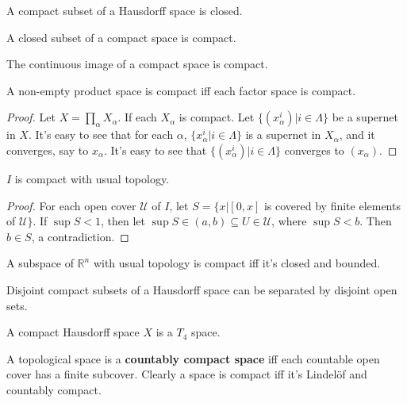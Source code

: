 \documentclass[12pt]{book}
\begin{document}
\begin{theorem}
	A compact subset of a Hausdorff space is closed.
\end{theorem}

\begin{theorem}
	A closed subset of a compact space is compact.
\end{theorem}

\begin{theorem}
	The continuous image of a compact space is compact.
\end{theorem}

\begin{theorem}
	A non-empty product space is compact iff each factor space is compact.
\end{theorem}
\begin{proof}
	Let $X=\prod_\alpha X_\alpha$. If each $X_\alpha$ is compact. Let $\{(x_\alpha^i)|i\in \Lambda\}$ be a supernet in $X$. It's easy to see that for each $\alpha$, $\{x_\alpha^i|i\in \Lambda\}$ is a supernet in $X_\alpha$, and it converges, say to $x_\alpha$. It's easy to see that $\{(x_\alpha^i)|i\in \Lambda\}$ converges to $(x_\alpha)$.
\end{proof}

\begin{theorem}
	$I$ is compact with usual topology.
\end{theorem}
\begin{proof}
	For each open cover $\mathcal U$ of $I$, let $S=\{x|[0,x]$ is covered by finite elements of $\mathcal U\}$. If $\sup S<1$, then let $\sup S\in (a,b)\subseteq U\in\mathcal U$, where $\sup S<b$. Then $b\in S$, a contradiction.
\end{proof}

\begin{corollary}
	A subspace of $\mathbb R^n$ with usual topology is compact iff it's closed and bounded.
\end{corollary}

\begin{lemma}
	Disjoint compact subsets of a Hausdorff space can be separated by disjoint open sets.
\end{lemma}

\begin{corollary}
	A compact Hausdorff space $X$ is a $T_4$ space.
\end{corollary}

\begin{definition}
	A topological space is a {\bf countably compact space} iff each countable open cover has a finite subcover. Clearly a space is compact iff it's Lindel\"of and countably compact.
\end{definition}
\end{document}
